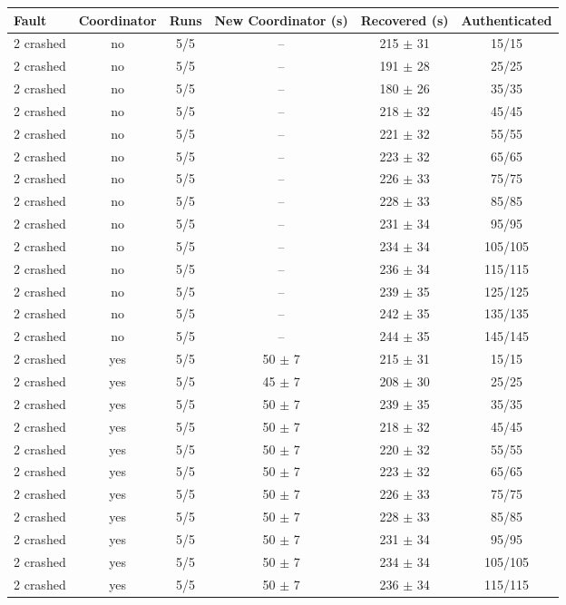 \begin{tabular}{lccccc}
\hline
\textbf{Fault} & \textbf{Coordinator} & \textbf{Runs} & \textbf{New Coordinator (s)} & \textbf{Recovered (s)} & \textbf{Authenticated} \\
\hline
2 crashed & no & 5/5 & -- & 215 $\pm$ 31 & 15/15 \\
2 crashed & no & 5/5 & -- & 191 $\pm$ 28 & 25/25 \\
2 crashed & no & 5/5 & -- & 180 $\pm$ 26 & 35/35 \\
2 crashed & no & 5/5 & -- & 218 $\pm$ 32 & 45/45 \\
2 crashed & no & 5/5 & -- & 221 $\pm$ 32 & 55/55 \\
2 crashed & no & 5/5 & -- & 223 $\pm$ 32 & 65/65 \\
2 crashed & no & 5/5 & -- & 226 $\pm$ 33 & 75/75 \\
2 crashed & no & 5/5 & -- & 228 $\pm$ 33 & 85/85 \\
2 crashed & no & 5/5 & -- & 231 $\pm$ 34 & 95/95 \\
2 crashed & no & 5/5 & -- & 234 $\pm$ 34 & 105/105 \\
2 crashed & no & 5/5 & -- & 236 $\pm$ 34 & 115/115 \\
2 crashed & no & 5/5 & -- & 239 $\pm$ 35 & 125/125 \\
2 crashed & no & 5/5 & -- & 242 $\pm$ 35 & 135/135 \\
2 crashed & no & 5/5 & -- & 244 $\pm$ 35 & 145/145 \\
2 crashed & yes & 5/5 & 50 $\pm$ 7 & 215 $\pm$ 31 & 15/15 \\
2 crashed & yes & 5/5 & 45 $\pm$ 7 & 208 $\pm$ 30 & 25/25 \\
2 crashed & yes & 5/5 & 50 $\pm$ 7 & 239 $\pm$ 35 & 35/35 \\
2 crashed & yes & 5/5 & 50 $\pm$ 7 & 218 $\pm$ 32 & 45/45 \\
2 crashed & yes & 5/5 & 50 $\pm$ 7 & 220 $\pm$ 32 & 55/55 \\
2 crashed & yes & 5/5 & 50 $\pm$ 7 & 223 $\pm$ 32 & 65/65 \\
2 crashed & yes & 5/5 & 50 $\pm$ 7 & 226 $\pm$ 33 & 75/75 \\
2 crashed & yes & 5/5 & 50 $\pm$ 7 & 228 $\pm$ 33 & 85/85 \\
2 crashed & yes & 5/5 & 50 $\pm$ 7 & 231 $\pm$ 34 & 95/95 \\
2 crashed & yes & 5/5 & 50 $\pm$ 7 & 234 $\pm$ 34 & 105/105 \\
2 crashed & yes & 5/5 & 50 $\pm$ 7 & 236 $\pm$ 34 & 115/115 \\

\end{tabular}

